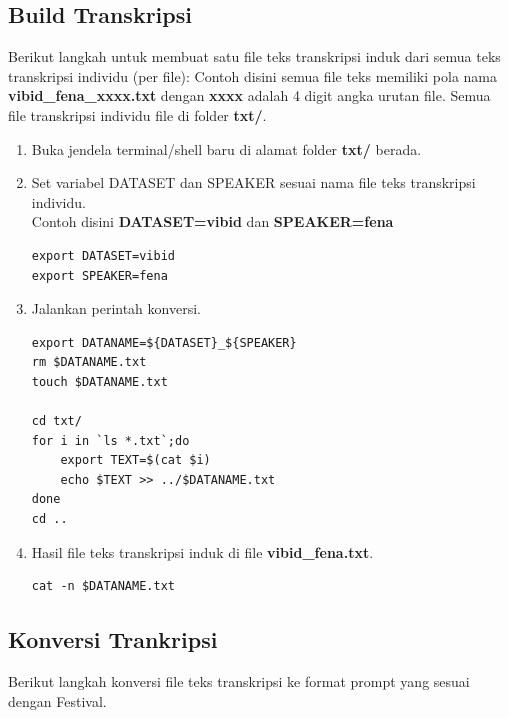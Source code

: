 \documentclass[12pt,]{article}
\begin{document}
	\subsection{Build Transkripsi}

	Berikut langkah untuk membuat satu file teks transkripsi induk dari semua teks transkripsi individu (per file):
	Contoh disini semua file teks memiliki pola nama \textbf{vibid\_fena\_xxxx.txt} dengan \textbf{xxxx} adalah 4 digit angka urutan file.
	Semua file transkripsi individu file di folder \textbf{txt/}.

	\begin{enumerate}
		\item Buka jendela terminal/shell baru di alamat folder \textbf{txt/} berada.

		\newpage
		\item Set variabel DATASET dan SPEAKER sesuai nama file teks transkripsi individu.\\
		Contoh disini \textbf{DATASET=vibid} dan \textbf{SPEAKER=fena}
		\begin{verbatim}
export DATASET=vibid
export SPEAKER=fena
		\end{verbatim}

		\item Jalankan perintah konversi.
		\begin{verbatim}
export DATANAME=${DATASET}_${SPEAKER}
rm $DATANAME.txt
touch $DATANAME.txt

cd txt/
for i in `ls *.txt`;do
	export TEXT=$(cat $i)
	echo $TEXT >> ../$DATANAME.txt
done
cd ..
		\end{verbatim}

		\item Hasil file teks transkripsi induk di file \textbf{vibid\_fena.txt}.
		\begin{verbatim}
cat -n $DATANAME.txt
		\end{verbatim}

	\end{enumerate}

	\newpage
	\subsection{Konversi Trankripsi}

	Berikut langkah konversi file teks transkripsi ke format prompt yang sesuai dengan Festival.
\end{document}
